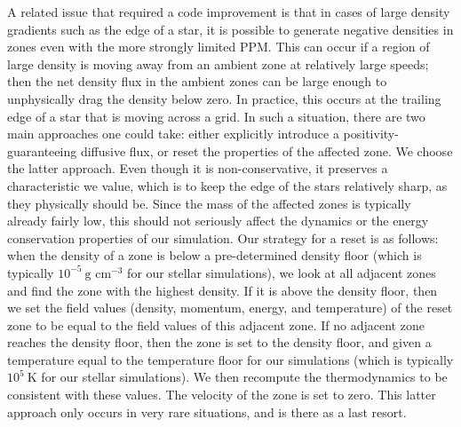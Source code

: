 \documentclass[iop,numberedappendix]{../emulateapj}
\begin{document}
A related issue that required a code improvement is that in cases of
large density gradients such as the edge of a star, it is possible to
generate negative densities in zones even with the more strongly
limited PPM. This can occur if a region of large density is moving
away from an ambient zone at relatively large speeds; then the net
density flux in the ambient zones can be large enough to unphysically
drag the density below zero. In practice, this occurs at the
trailing edge of a star that is moving across a grid. In such a
situation, there are two main approaches one could take: either
explicitly introduce a positivity-guaranteeing diffusive flux, or
reset the properties of the affected zone. We choose the latter
approach. Even though it is non-conservative, it preserves a
characteristic we value, which is to keep the edge of the stars
relatively sharp, as they physically should be. Since the mass of the
affected zones is typically already fairly low, this should not
seriously affect the dynamics or the energy conservation properties of our
simulation. Our strategy for a reset is as follows: when the density of 
a zone is below a pre-determined density floor (which is typically 
$10^{-5}\ \text{g cm}^{-3}$ for our stellar simulations), we look
at all adjacent zones and find the zone with the highest density.
If it is above the density floor, then we set the field values 
(density, momentum, energy, and temperature) of the
reset zone to be equal to the field values of this 
adjacent zone. If no adjacent zone reaches the density floor, then
the zone is set to the density floor, and given a temperature equal 
to the temperature floor for our simulations (which is typically 
$10^{5}\ \text{K}$ for our stellar simulations). We then recompute 
the thermodynamics to be consistent with these values. The 
velocity of the zone is set to zero. This latter approach only
occurs in very rare situations, and is there as a last resort.
\end{document}
